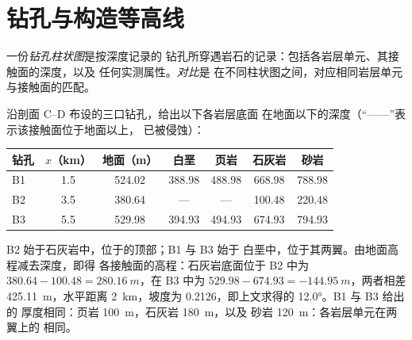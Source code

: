 \section{钻孔与构造等高线}\label{sec:b1:cross-sections:boreholes}

\begin{definition}[钻孔柱状图，对比]\label{def:b1:cross-sections:log}
一份\emph{钻孔柱状图}是按深度记录的
钻孔所穿遇岩石的记录：包括各岩层单元、其接触面的深度，以及
任何实测属性。\emph{对比}是
在不同柱状图之间，对应相同岩层单元与接触面的匹配。
\end{definition}

沿剖面 C--D 布设的三口钻孔，给出以下各岩层底面
在地面以下的深度（“——”表示该接触面位于地面以上，
已被侵蚀）：
\begin{center}
\small
\begin{tabular}{lcccccc}
\hline
钻孔 & $x$（km） & 地面（m） & 白垩 & 页岩 & 石灰岩 & 砂岩 \\
\hline
B1 & 1.5 & 524.02 & 388.98 & 488.98 & 668.98 & 788.98 \\
B2 & 3.5 & 380.64 & --- & --- & 100.48 & 220.48 \\
B3 & 5.5 & 529.98 & 394.93 & 494.93 & 674.93 & 794.93 \\
\hline
\end{tabular}
\end{center}
B2 始于石灰岩中，位于的顶部；B1 与 B3 始于
白垩中，位于其两翼。由地面高程减去深度，即得
各接触面的高程：石灰岩底面位于
B2 中为 $380.64 - 100.48 = \qty{280.16}{m}$，在 B3 中为 $529.98 - 674.93 =
\qty{-144.95}{m}$，两者相差 \qty{425.11}{m}，水平距离 \qty{2}{km}，坡度为
\num{0.2126}，即上文求得的 \ang{12.0}。B1 与 B3 给出的
厚度相同：页岩 \qty{100}{m}，石灰岩 \qty{180}{m}，以及
砂岩 \qty{120}{m}：各岩层单元在两翼上的
相同。

